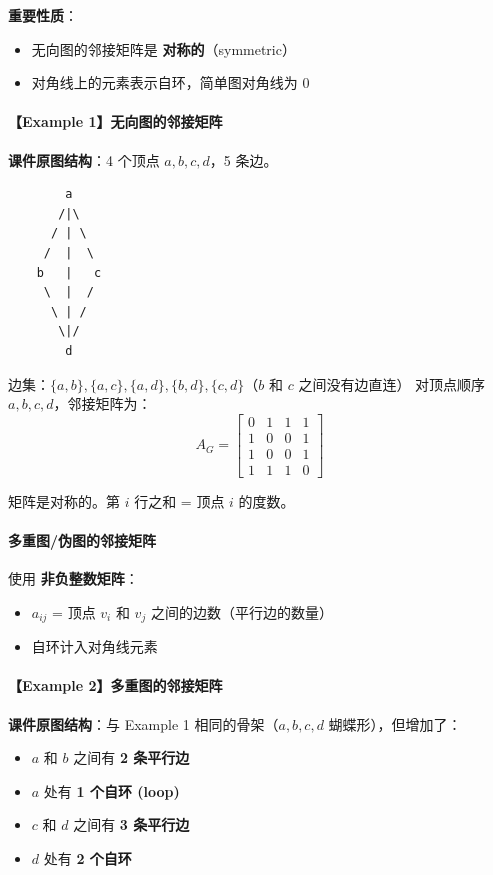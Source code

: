 \documentclass[10pt,a4paper,openany]{ctexbook}
\theoremstyle{definition}
\theoremstyle{remark}
\renewenvironment{quote}
  {\list{}{\leftmargin=1em\rightmargin=0pt\topsep=0.5pt\partopsep=0pt}\item[]}
  {\endlist}
\begin{document}
\textbf{重要性质}：
\begin{itemize}
\item 无向图的邻接矩阵是 \textbf{对称的}（symmetric）
\item 对角线上的元素表示自环，简单图对角线为 0

\end{itemize}

\paragraph{【Example 1】无向图的邻接矩阵}

\textbf{课件原图结构}：4 个顶点 $a, b, c, d$，5 条边。
{\footnotesize\begin{verbatim}
        a
       /|\
      / | \
     /  |  \
    b   |   c
     \  |  /
      \ | /
       \|/
        d
\end{verbatim}}

边集：$\{a,b\}, \{a,c\}, \{a,d\}, \{b,d\}, \{c,d\}$（$b$ 和 $c$ 之间没有边直连）
对顶点顺序 $a, b, c, d$，邻接矩阵为：
\[
A_G = 
\begin{bmatrix}
0 & 1 & 1 & 1 \\
1 & 0 & 0 & 1 \\
1 & 0 & 0 & 1 \\
1 & 1 & 1 & 0
\end{bmatrix}
\]

\begin{quote}
矩阵是对称的。第 $i$ 行之和 = 顶点 $i$ 的度数。

\end{quote}

\paragraph{多重图/伪图的邻接矩阵}

使用 \textbf{非负整数矩阵}：
\begin{itemize}
\item $a_{ij}$ = 顶点 $v_i$ 和 $v_j$ 之间的边数（平行边的数量）
\item 自环计入对角线元素

\end{itemize}

\paragraph{【Example 2】多重图的邻接矩阵}

\textbf{课件原图结构}：与 Example 1 相同的骨架（$a,b,c,d$ 蝴蝶形），但增加了：
\begin{itemize}
\item $a$ 和 $b$ 之间有 \textbf{2 条平行边}
\item $a$ 处有 \textbf{1 个自环 (loop)}
\item $c$ 和 $d$ 之间有 \textbf{3 条平行边}
\item $d$ 处有 \textbf{2 个自环}

\end{itemize}
\end{document}
